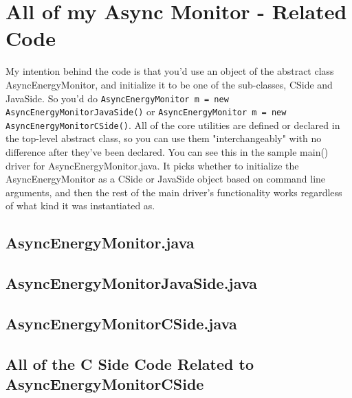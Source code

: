 

\section{All of my Async Monitor - Related Code}
    My intention behind the code is that you'd use an object of the abstract class AsyncEnergyMonitor, and initialize it to be one of the sub-classes, CSide and JavaSide. So you'd do \texttt{AsyncEnergyMonitor m = new AsyncEnergyMonitorJavaSide()} or \texttt{AsyncEnergyMonitor m = new AsyncEnergyMonitorCSide()}. All of the core utilities
    are defined or declared in the top-level abstract class, so you can use them "interchangeably" with no difference after they've been declared. You can see this
    in the sample main() driver for AsyncEnergyMonitor.java. It picks whether to initialize the AsyncEnergyMonitor as a CSide or JavaSide object based on command line arguments, and then
    the rest of the main driver's functionality works regardless of what kind it was instantiated as.
   
\subsection{AsyncEnergyMonitor.java}
    \begin{framed}
        \lstset{language=java}
        
    \end{framed}
\subsection{AsyncEnergyMonitorJavaSide.java}
    \begin{framed}
        \lstset{language=java}
        
    \end{framed}
\subsection{AsyncEnergyMonitorCSide.java}
    \begin{framed}
        \lstset{language=java}
        
    \end{framed}
\subsection{All of the C Side Code Related to AsyncEnergyMonitorCSide}
